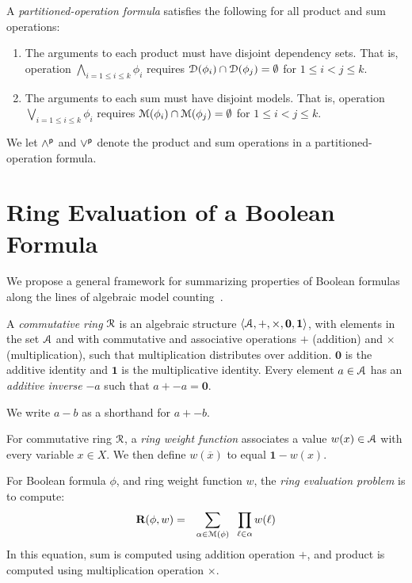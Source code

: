 \documentclass[letterpaper,USenglish,cleveref, autoref, thm-restate]{lipics-v2021}
\newcommand{\pand}{\mathbin{\land^{\sf p}}}
\newcommand{\por}{\mathbin{\lor^{\sf p}}}
\newcommand{\obar}[1]{\overline{#1}}
\newcommand{\lit}{\ell}
\newcommand{\varset}{X}
\newcommand{\dependencyset}{{\cal D}}
\newcommand{\ring}{{\cal R}}
\newcommand{\dset}{{\cal A}}
\newcommand{\rep}{\textbf{R}}
\newcommand{\radd}{+}
\newcommand{\rmul}{\times}
\newcommand{\addident}{\textbf{0}}
\newcommand{\mulident}{\textbf{1}}
\newcommand{\modelset}{{\cal M}}
\begin{document}
  A {\em partitioned-operation formula}
 satisfies the following for all product and sum operations:
      \begin{enumerate}
      \item The arguments to each product must have disjoint dependency sets.  That is, operation
        $\bigwedge_{i=1 \leq i \leq k} \phi_i$ requires $\dependencyset(\phi_i) \cap \dependencyset(\phi_j) = \emptyset$ for $1 \leq i < j \leq k$.
      \item The arguments to each sum must have disjoint models.  That is, operation
        $\bigvee_{i=1 \leq i \leq k} \phi_i$ requires $\modelset(\phi_i) \cap \modelset(\phi_j) = \emptyset$ for $1 \leq i < j \leq k$.
      \end{enumerate}
     We let $\pand$ and $\por$ denote the product and sum operations in a partitioned-operation formula.

  \section{Ring Evaluation of a Boolean Formula}

We propose a general framework for summarizing properties of Boolean
formulas along the lines of algebraic model counting~\cite{kimmig:jal:2017}.

\begin{definition}
  A {\em commutative ring} $\ring$ is an algebraic structure
  $\langle \dset, \radd, \rmul, \addident, \mulident \rangle$,
  with elements in the set $\dset$ and with commutative and
  associative operations $\radd$ (addition) and $\rmul$ (multiplication),
  such that multiplication distributes
  over addition.  $\addident$ is the additive identity and $\mulident$ is
  the multiplicative identity.  Every element $a \in \dset$ has an
  {\em additive inverse} $-a$ such that $a + -a = \addident$.
\label{def:ring}
\end{definition}
We write $a - b$ as a shorthand for $a + -b$.

\begin{definition}
\label{def:ring_evaluation}
  For commutative ring $\ring$, a {\em ring weight function} associates a value $w(x) \in \dset$ with
  every variable $x \in \varset$.  We then define $w(\obar{x})$ to equal $\mulident-w(x)$.

  For Boolean formula $\phi$, and ring weight function $w$, the {\em ring evaluation problem} is to compute:
  \begin{eqnarray}
    \rep(\phi, w) & = & \sum_{\alpha \in \modelset(\phi)} \;\; \prod_{\lit \in \alpha} w(\ell) \label{eqn:rep}
  \end{eqnarray}
  In this equation, sum \scalebox{0.8}{$\sum$} is computed using addition operation $\radd$, and product \scalebox{0.8}{$\prod$} is computed using multiplication operation $\rmul$.
\label{def:weight}
\end{definition}
\end{document}
